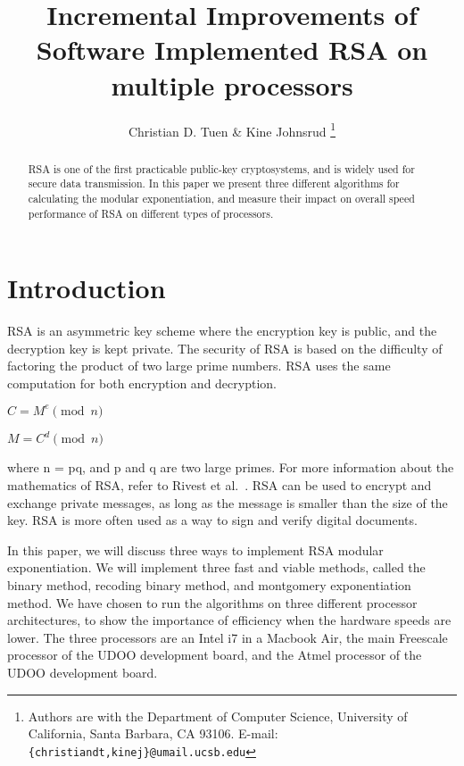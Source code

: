 \documentclass[twocolumn]{IEEEtran}
\begin{document}
\title{Incremental Improvements of Software Implemented RSA on multiple processors}


\author{Christian D. Tuen \& Kine Johnsrud
\thanks{Authors are with the
Department of Computer Science,
University of California, Santa Barbara, CA 93106.
E-mail: \texttt{\{christiandt,kinej\}@umail.ucsb.edu}}
}


\maketitle

\begin{abstract}
RSA is one of the first practicable public-key cryptosystems, and is widely used for secure data transmission. In this paper we present three different algorithms for calculating the modular exponentiation, and measure their impact on overall speed performance of RSA on different types of processors.
\end{abstract}

\section{Introduction}
RSA is an asymmetric key scheme where the encryption key is public, and the decryption key is kept private. The security of RSA is based on the difficulty of factoring the product of two large prime numbers. RSA uses the same computation for both encryption and decryption.

\bigskip

\centerline{$C = M^e \pmod{n}$}
\centerline{$M = C^d \pmod{n}$}

\bigskip

where n = pq, and p and q are two large primes. For more information about the mathematics of RSA, refer to Rivest et al.~\cite{rsa}. RSA can be used to encrypt and exchange private messages, as long as the message is smaller than the size of the key. RSA is more often used as a way to sign and verify digital documents. 

In this paper, we will discuss three ways to implement RSA modular exponentiation. We will implement three fast and viable methods, called the binary method, recoding binary method, and montgomery exponentiation method. We have chosen to run the algorithms on three different processor architectures, to show the importance of efficiency when the hardware speeds are lower. The three processors are an Intel i7 in a Macbook Air, the main Freescale processor of the UDOO development board, and the Atmel processor of the UDOO development board.
\end{document}
